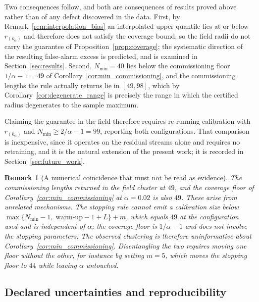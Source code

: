 \documentclass[a4paper]{cas-sc}
\newtheorem{remark}{Remark}
\newcommand{\residual}{\ensuremath{r}}
\begin{document}
Two consequences follow, and both are consequences of results proved above
rather than of any defect discovered in the data. First, by
Remark~\ref{rem:interpolation_bias} an interpolated upper quantile lies at or
below \(\residual_{(k_\alpha)}\) and therefore does not satisfy the coverage
bound, so the field radii do not carry the guarantee of
Proposition~\ref{prop:coverage}; the systematic direction of the resulting
false-alarm excess is predicted, and is examined in
Section~\ref{sec:results}. Second, \(N_{\min}=40\) lies below the
commissioning floor \(1/\alpha-1=49\) of
Corollary~\ref{cor:min_commissioning}, and the commissioning lengths the rule
actually returns lie in \([49,98]\), which by
Corollary~\ref{cor:degenerate_range} is precisely the range in which the
certified radius degenerates to the sample maximum.

Claiming the guarantee in the field therefore requires re-running calibration
with \(\residual_{(k_\alpha)}\) and \(N_{\min}\ge 2/\alpha-1=99\), reporting
both configurations. That comparison is inexpensive, since it operates on the
residual streams alone and requires no retraining, and it is the natural
extension of the present work; it is recorded in
Section~\ref{sec:future_work}.

\begin{remark}[A numerical coincidence that must not be read as evidence]
\label{rem:49_confound}
The commissioning lengths returned in the field cluster at \(49\), and the
coverage floor of Corollary~\ref{cor:min_commissioning} at \(\alpha=0.02\) is
also \(49\). These arise from unrelated mechanisms. The stopping rule cannot
emit a calibration size below
\(\max\{N_{\min}-1,\;\text{warm-up}-1+L\}+m\), which equals \(49\) at the
configuration used and is \emph{independent of} \(\alpha\); the coverage floor
is \(1/\alpha-1\) and does not involve the stopping parameters. The observed
clustering is therefore uninformative about
Corollary~\ref{cor:min_commissioning}. Disentangling the two requires moving
one floor without the other, for instance by setting \(m=5\), which moves the
stopping floor to \(44\) while leaving \(\alpha\) untouched.
\end{remark}

\subsection{Declared uncertainties and reproducibility}
\label{subsec:design_reproducibility}
\end{document}
